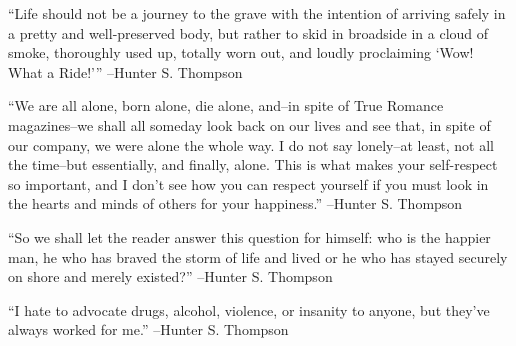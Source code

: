 \documentclass{article}%
\begin{document}
\linebreak%
\vspace{1mm}%
\begin{minipage}{\textwidth}%
\flushleft%
“Life should not be a journey to the grave with the intention of arriving safely in a pretty and well{-}preserved body, but rather to skid in broadside in a cloud of smoke, thoroughly used up, totally worn out, and loudly proclaiming ‘Wow! What a Ride!’”%
\linebreak%
\vspace{1mm}%
–Hunter S. Thompson%
\linebreak%
\vspace{1mm}%
\end{minipage}%
\linebreak%
\vspace{1mm}%
\begin{minipage}{\textwidth}%
\flushleft%
“We are all alone, born alone, die alone, and–in spite of True Romance magazines–we shall all someday look back on our lives and see that, in spite of our company, we were alone the whole way. I do not say lonely–at least, not all the time–but essentially, and finally, alone. This is what makes your self{-}respect so important, and I don't see how you can respect yourself if you must look in the hearts and minds of others for your happiness.”%
\linebreak%
\vspace{1mm}%
–Hunter S. Thompson%
\linebreak%
\vspace{1mm}%
\end{minipage}%
\linebreak%
\vspace{1mm}%
\begin{minipage}{\textwidth}%
\flushleft%
“So we shall let the reader answer this question for himself: who is the happier man, he who has braved the storm of life and lived or he who has stayed securely on shore and merely existed?”%
\linebreak%
\vspace{1mm}%
–Hunter S. Thompson%
\linebreak%
\vspace{1mm}%
\end{minipage}%
\linebreak%
\vspace{1mm}%
\begin{minipage}{\textwidth}%
\flushleft%
“I hate to advocate drugs, alcohol, violence, or insanity to anyone, but they've always worked for me.”%
\linebreak%
\vspace{1mm}%
–Hunter S. Thompson%
\linebreak%
\vspace{1mm}%
\end{minipage}%
\end{document}
